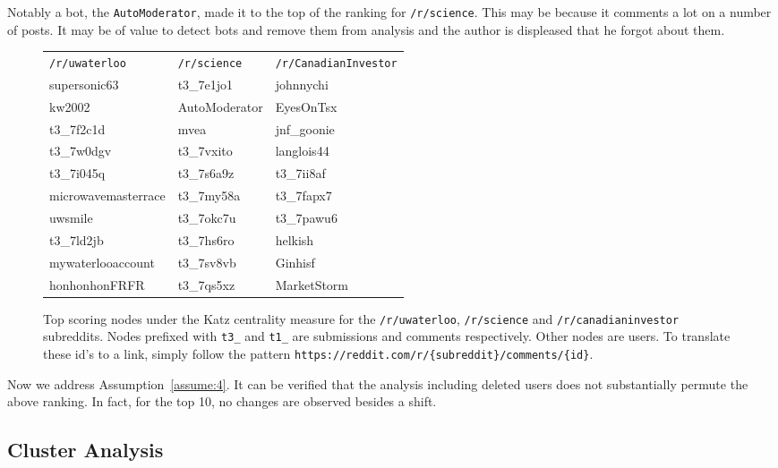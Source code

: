 \documentclass[letterpaper, 10 pt, conference]{ieeeconf}
\theoremstyle{definition}
\begin{document}
Notably a bot, the \texttt{AutoModerator}, made it to the top of the ranking for \texttt{/r/science}. This may be because it comments a lot on a number of posts. It may be of value to detect bots and remove them from analysis and the author is displeased that he forgot about them.
\begin{figure*}
  \centering
  \begin{tabular}{l|l|l}
    \texttt{/r/uwaterloo}   & \texttt{/r/science} & \texttt{/r/CanadianInvestor} \\ \hhline{=|=|=}
    supersonic63            & t3\_7e1jo1          & johnnychi \\ \hline
    kw2002                  & AutoModerator       & EyesOnTsx\\ \hline
    t3\_7f2c1d              & mvea                & jnf\_goonie\\ \hline
    t3\_7w0dgv              & t3\_7vxito          & langlois44\\ \hline
    t3\_7i045q              & t3\_7s6a9z          & t3\_7ii8af\\ \hline
    microwavemasterrace     & t3\_7my58a          & t3\_7fapx7\\ \hline
    uwsmile                 & t3\_7okc7u          & t3\_7pawu6\\ \hline
    t3\_7ld2jb              & t3\_7hs6ro          & helkish\\ \hline
    mywaterlooaccount       & t3\_7sv8vb          & Ginhisf\\ \hline
    honhonhonFRFR           & t3\_7qs5xz          & MarketStorm
  \end{tabular}
  \caption{Top scoring nodes under the Katz centrality measure for the \texttt{/r/uwaterloo}, \texttt{/r/science} and \texttt{/r/canadianinvestor} subreddits. Nodes prefixed with \texttt{t3\_} and \texttt{t1\_} are submissions and comments respectively. Other nodes are users. To translate these id's to a link, simply follow the pattern \texttt{https://reddit.com/r/\{subreddit\}/comments/\{id\}}.}
  \label{fig:analysis:katz-table}
\end{figure*}
Now we address Assumption~\ref{assume:4}. It can be verified that the analysis including deleted users does not substantially permute the above ranking. In fact, for the top 10, no changes are observed besides a shift.

\subsection{Cluster Analysis}
\end{document}
